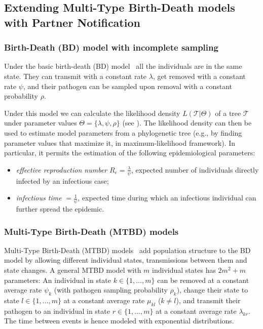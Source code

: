 \documentclass[10pt,letterpaper]{article}
\begin{document}
\subsection*{Extending Multi-Type Birth-Death models with Partner Notification}
\subsubsection*{Birth-Death (BD) model with incomplete sampling}
Under the basic birth-death (BD) model~\cite{Stadler2009} all the individuals are in the same state. They can transmit with a constant rate $\lambda$, get removed with a constant rate $\psi$, and their pathogen can be sampled upon removal with a constant probability $\rho$. 

Under this model we can calculate the likelihood density $L(\mathscr{T}|\Theta)$ of a tree $\mathscr{T}$ under parameter values $\Theta = \{\lambda, \psi, \rho\}$ (see ). The likelihood density can then be used to estimate model parameters from a phylogenetic tree (e.g., by finding parameter values that maximize it, in maximum-likelihood framework). In particular, it permits the estimation of the following epidemiological parameters: 

\begin{itemize}
\item \textit{effective reproduction number} $R_e = \frac{\lambda}{\psi}$, expected number of individuals directly infected by an infectious case;
\item \textit{infectious time} $=\frac{1}{\psi}$, expected time during which an infectious individual can further spread the epidemic.
\end{itemize} 



\subsubsection*{Multi-Type Birth-Death (MTBD) models}
Multi-Type Birth-Death (MTBD) models~\cite{Stadler2013a} add population structure to the BD model by allowing different individual states, transmissions between them and state changes. A general MTBD model with $m$ individual states has $2m^2 + m$ parameters: An individual in state $k \in \{1, \ldots, m\}$ can be removed at a constant average rate $\psi_k$ (with pathogen sampling probability $\rho_k$), change their state to state $l \in \{1, \ldots, m\}$ at a constant average rate $\mu_{kl}$ ($k \neq l$), and transmit their pathogen to an individual in state $r \in \{1, \ldots, m\} $ at a constant average rate $\lambda_{kr}$. The time between events %
is hence modeled with exponential distributions.
\end{document}
